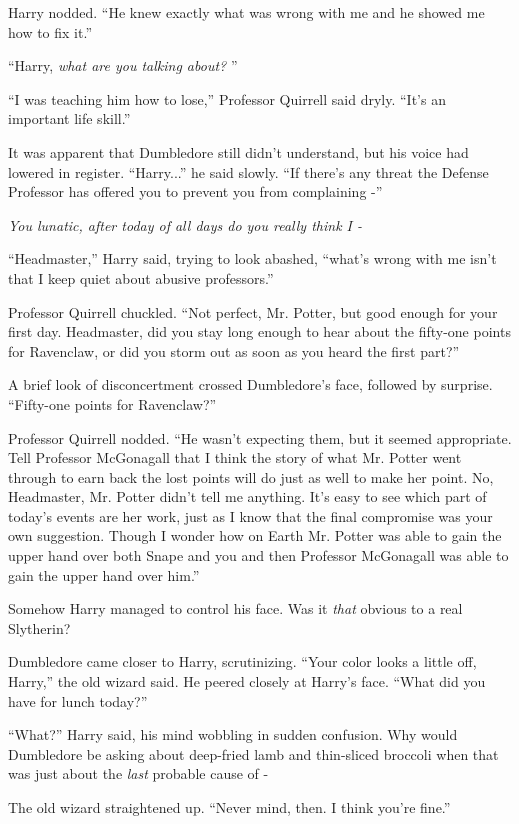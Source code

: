Harry nodded. ``He knew exactly what was wrong with me and he showed me
how to fix it.''

``Harry, \emph{what are you talking about?} ''

``I was teaching him how to lose,'' Professor Quirrell said dryly.
``It's an important life skill.''

It was apparent that Dumbledore still didn't understand, but his voice
had lowered in register. ``Harry...'' he said slowly. ``If there's
any threat the Defense Professor has offered you to prevent you from
complaining -''

\emph{You lunatic, after today of all days do you really think I -}

``Headmaster,'' Harry said, trying to look abashed, ``what's wrong with
me isn't that I keep quiet about abusive professors.''

Professor Quirrell chuckled. ``Not perfect, Mr. Potter, but good enough
for your first day. Headmaster, did you stay long enough to hear about
the fifty-one points for Ravenclaw, or did you storm out as soon as you
heard the first part?''

A brief look of disconcertment crossed Dumbledore's face, followed by
surprise. ``Fifty-one points for Ravenclaw?''

Professor Quirrell nodded. ``He wasn't expecting them, but it seemed
appropriate. Tell Professor McGonagall that I think the story of what
Mr. Potter went through to earn back the lost points will do just as
well to make her point. No, Headmaster, Mr. Potter didn't tell me
anything. It's easy to see which part of today's events are her work,
just as I know that the final compromise was your own suggestion. Though
I wonder how on Earth Mr. Potter was able to gain the upper hand over
both Snape and you and then Professor McGonagall was able to gain the
upper hand over him.''

Somehow Harry managed to control his face. Was it \emph{that} obvious to
a real Slytherin?

Dumbledore came closer to Harry, scrutinizing. ``Your color looks a
little off, Harry,'' the old wizard said. He peered closely at Harry's
face. ``What did you have for lunch today?''

``What?'' Harry said, his mind wobbling in sudden confusion. Why would
Dumbledore be asking about deep-fried lamb and thin-sliced broccoli when
that was just about the \emph{last} probable cause of -

The old wizard straightened up. ``Never mind, then. I think you're
fine.''

